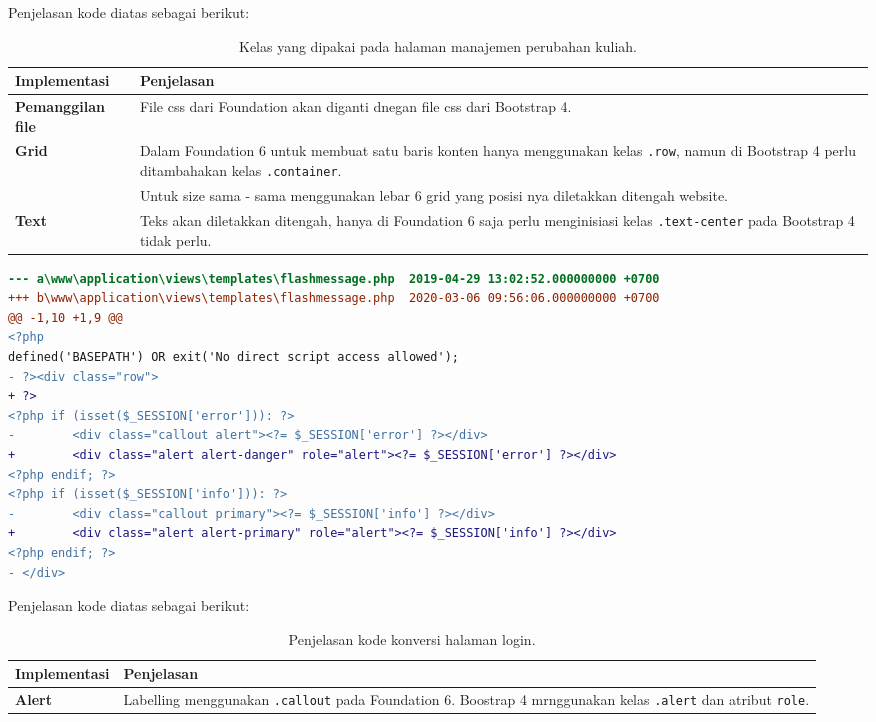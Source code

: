 \noindent Penjelasan kode diatas sebagai berikut:
\begin{table}[H]
	\centering
	\begin{tabularx}{\textwidth}{lX}
		\toprule
		Implementasi     & Penjelasan \\
		\midrule
		\textbf{Pemanggilan file} & File css dari Foundation akan diganti dnegan file css dari Bootstrap 4.\\
		\textbf{Grid} & Dalam Foundation 6 untuk membuat satu baris konten hanya menggunakan kelas \texttt{.row}, namun di Bootstrap 4 perlu ditambahakan kelas \texttt{.container}.\\
		 & Untuk size sama - sama menggunakan lebar 6 grid yang posisi nya diletakkan ditengah website.\\
		\textbf{Text} & Teks akan diletakkan ditengah, hanya di Foundation 6 saja perlu menginisiasi kelas \texttt{.text-center} pada Bootstrap 4 tidak perlu.\\
		\bottomrule
	\end{tabularx}%
	\caption{Kelas yang dipakai pada halaman manajemen perubahan kuliah.}
\end{table}

\begin{lstlisting}[language=diff, caption=Perubahan file \path{\views\templates\flashmessage.php}, label=Entri, basicstyle=\ttfamily, frame=single,
columns=fullflexible, keepspaces=true, breaklines=true]
--- a\www\application\views\templates\flashmessage.php	2019-04-29 13:02:52.000000000 +0700
+++ b\www\application\views\templates\flashmessage.php	2020-03-06 09:56:06.000000000 +0700
@@ -1,10 +1,9 @@
<?php
defined('BASEPATH') OR exit('No direct script access allowed');
- ?><div class="row">
+ ?>
<?php if (isset($_SESSION['error'])): ?>
-        <div class="callout alert"><?= $_SESSION['error'] ?></div>
+        <div class="alert alert-danger" role="alert"><?= $_SESSION['error'] ?></div>
<?php endif; ?>
<?php if (isset($_SESSION['info'])): ?>
-        <div class="callout primary"><?= $_SESSION['info'] ?></div>
+        <div class="alert alert-primary" role="alert"><?= $_SESSION['info'] ?></div>
<?php endif; ?>
- </div>

\end{lstlisting}

\noindent Penjelasan kode diatas sebagai berikut:
\begin{table}[H]
	\centering
	\begin{tabularx}{\textwidth}{lX}
		\toprule
		Implementasi     & Penjelasan \\
		\midrule
		\textbf{Alert} & Labelling menggunakan \texttt{.callout} pada Foundation 6. Boostrap 4 mrnggunakan kelas \texttt{.alert} dan atribut \texttt{role}.\\
		\bottomrule
	\end{tabularx}%
	\caption{Penjelasan kode konversi halaman login.}
\end{table}

